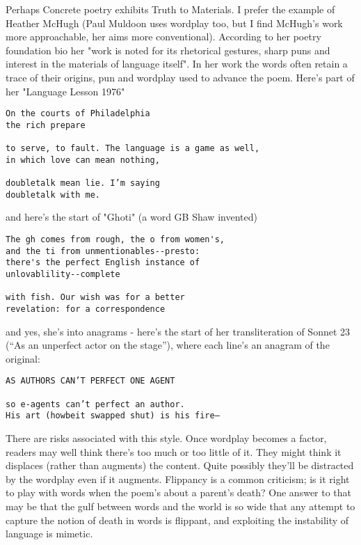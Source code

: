 \documentclass[11pt]{article}
\begin{document}
Perhaps Concrete poetry exhibits Truth to Materials. I prefer the example of Heather McHugh (Paul Muldoon uses wordplay too, but I find McHugh's work more approachable, her aims more conventional). According to her poetry foundation bio her "work is noted for its rhetorical gestures, sharp puns and interest in the materials of language itself". In her work the words often retain a trace of their origins, pun and wordplay used to advance the poem. Here's part of her "Language Lesson 1976"
\begin{verbatim}
On the courts of Philadelphia
the rich prepare

to serve, to fault. The language is a game as well,
in which love can mean nothing,

doubletalk mean lie. I’m saying
doubletalk with me.
\end{verbatim}
and here's the start of "Ghoti" (a word GB Shaw invented)
\begin{verbatim}
The gh comes from rough, the o from women's,
and the ti from unmentionables--presto:
there's the perfect English instance of
unlovablility--complete

with fish. Our wish was for a better
revelation: for a correspondence
\end{verbatim}
and yes, she's into anagrams - here's the start of her transliteration of Sonnet 23 (“As an unperfect actor on the stage”), where each line's an anagram of the original:
\begin{verbatim}
AS AUTHORS CAN’T PERFECT ONE AGENT

so e-agents can’t perfect an author.
His art (howbeit swapped shut) is his fire—
\end{verbatim}
There are risks associated with this style. Once wordplay becomes a factor, readers may well think there's too much or too little of it. They might think it displaces (rather than augments) the content. Quite possibly they'll be distracted by the wordplay even if it augments. Flippancy is a common criticism; is it right to play with words when the poem's about a parent's death? One answer to that may be that the gulf between words and the world is so wide that any attempt to capture the notion of death in words is flippant, and exploiting the instability of language is mimetic.
\end{document}
